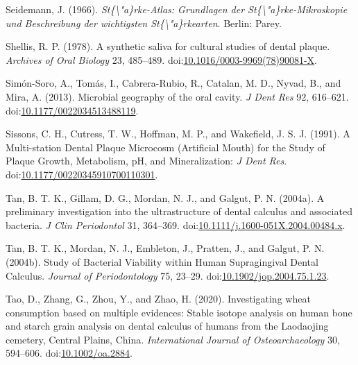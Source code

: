 \documentclass[utf8]{../templates/frontiersSCNS}
\newlength{\cslhangindent}
\newlength{\cslentryspacingunit} %
\newenvironment{CSLReferences}[2] %
 {%
  \setlength{\parindent}{0pt}
  \ifodd #1
  \let\oldpar\par
  \def\par{\hangindent=\cslhangindent\oldpar}
  \fi
  \setlength{\parskip}{#2\cslentryspacingunit}
 }%
 {}
\begin{document}
\begin{CSLReferences}{1}{0}
\leavevmode{}%
Seidemann, J. (1966). \emph{St\{\textbackslash"a\}rke-{Atlas}: {Grundlagen} der {St}\{\textbackslash"a\}rke-{Mikroskopie} und {Beschreibung} der wichtigsten {St}\{\textbackslash"a\}rkearten}. {Berlin}: {Parey}.

\leavevmode{}%
Shellis, R. P. (1978). A synthetic saliva for cultural studies of dental plaque. \emph{Archives of Oral Biology} 23, 485--489. doi:\href{https://doi.org/10.1016/0003-9969(78)90081-X}{10.1016/0003-9969(78)90081-X}.

\leavevmode{}%
Simón-Soro, A., Tomás, I., Cabrera-Rubio, R., Catalan, M. D., Nyvad, B., and Mira, A. (2013). Microbial geography of the oral cavity. \emph{J Dent Res} 92, 616--621. doi:\href{https://doi.org/10.1177/0022034513488119}{10.1177/0022034513488119}.

\leavevmode{}%
Sissons, C. H., Cutress, T. W., Hoffman, M. P., and Wakefield, J. S. J. (1991). A {Multi-station Dental Plaque Microcosm} ({Artificial Mouth}) for the {Study} of {Plaque Growth}, {Metabolism}, {pH}, and {Mineralization}: \emph{J Dent Res}. doi:\href{https://doi.org/10.1177/00220345910700110301}{10.1177/00220345910700110301}.

\leavevmode{}%
Tan, B. T. K., Gillam, D. G., Mordan, N. J., and Galgut, P. N. (2004a). A preliminary investigation into the ultrastructure of dental calculus and associated bacteria. \emph{J Clin Periodontol} 31, 364--369. doi:\href{https://doi.org/10.1111/j.1600-051X.2004.00484.x}{10.1111/j.1600-051X.2004.00484.x}.

\leavevmode{}%
Tan, B. T. K., Mordan, N. J., Embleton, J., Pratten, J., and Galgut, P. N. (2004b). Study of {Bacterial Viability} within {Human Supragingival Dental Calculus}. \emph{Journal of Periodontology} 75, 23--29. doi:\href{https://doi.org/10.1902/jop.2004.75.1.23}{10.1902/jop.2004.75.1.23}.

\leavevmode{}%
Tao, D., Zhang, G., Zhou, Y., and Zhao, H. (2020). Investigating wheat consumption based on multiple evidences: {Stable} isotope analysis on human bone and starch grain analysis on dental calculus of humans from the {Laodaojing} cemetery, {Central Plains}, {China}. \emph{International Journal of Osteoarchaeology} 30, 594--606. doi:\href{https://doi.org/10.1002/oa.2884}{10.1002/oa.2884}.


\end{CSLReferences}
\end{document}
